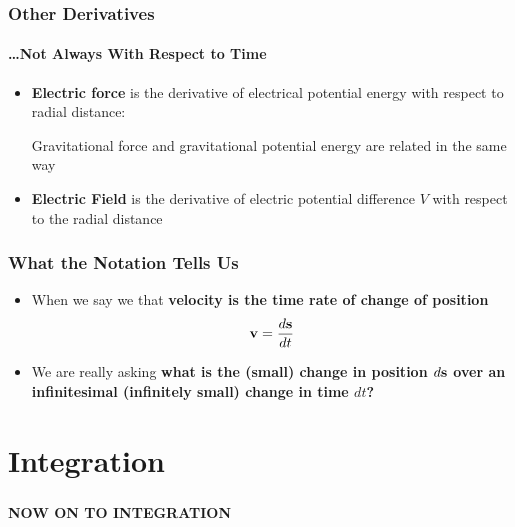 \documentclass[12pt,compress,aspectratio=169]{beamer}
\newcommand{\mb}[1]{\ensuremath\mathbf{#1}}
\begin{document}
\begin{frame}
  \frametitle{Other Derivatives}
  \framesubtitle{\ldots Not Always With Respect to Time}
  \begin{itemize}
  \item\textbf{Electric force} is the derivative of electrical potential
    energy with respect to radial distance:


    \vspace{-.1in}Gravitational force and gravitational potential energy are
    related in the same way
  \item\textbf{Electric Field} is the derivative of electric potential
    difference $V$ with respect to the radial distance

        
  \end{itemize}
\end{frame}

\begin{frame}
  \frametitle{What the Notation Tells Us}
  \begin{itemize}
  \item When we say we that \textbf{velocity is the time rate of change of
    position}
    {\Large
      \begin{displaymath}
        \mb{v}=\frac{d\mb{s}}{dt}
      \end{displaymath}
    }
  \item We are really asking \textbf{what is the (small) change in position
    $d\mb{s}$ over an infinitesimal (infinitely small) change in time $dt$?}
  \end{itemize}
\end{frame}

\section{Integration}

\begin{frame}
  \frametitle{}
  \begin{center}
    {\LARGE\textbf{NOW ON TO INTEGRATION}}
  \end{center}
\end{frame}
\end{document}
